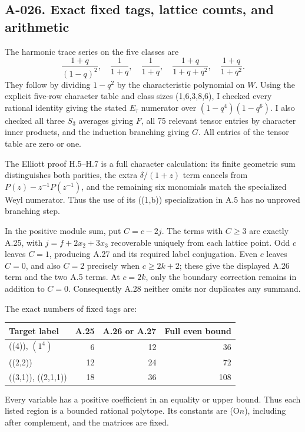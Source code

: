 \documentclass[
  10pt,
]{article}
\begin{document}
\subsection{A-026. Exact fixed tags, lattice counts, and
arithmetic}\label{a-026.-exact-fixed-tags-lattice-counts-and-arithmetic}

The harmonic trace series on the five classes are \[
\frac{1+q}{(1-q)^2},\quad\frac1{1+q},\quad\frac1{1+q},\quad
\frac{1+q}{1+q+q^2},\quad\frac{1+q}{1+q^2}.
\] They follow by dividing \(1-q^2\) by the characteristic polynomial on
\(W\). Using the explicit five-row character table and class sizes
(1,6,3,8,6), I checked every rational identity giving the stated
\(E_\tau\) numerator over \((1-q^4)(1-q^6)\). I also checked all three
\(S_3\) averages giving \(F\), all 75 relevant tensor entries by
character inner products, and the induction branching giving \(G\). All
entries of the tensor table are zero or one.

The Elliott proof H.5--H.7 is a full character calculation: its finite
geometric sum distinguishes both parities, the extra \(\delta/(1+z)\)
term cancels from \(P(z)-z^{-1}P(z^{-1})\), and the remaining six
monomials match the specialized Weyl numerator. Thus the use of its
((1,b)) specialization in A.5 has no unproved branching step.

In the positive module sum, put \(C=c-2j\). The terms with \(C\ge3\) are
exactly A.25, with \(j=f+2x_2+3x_3\) recoverable uniquely from each
lattice point. Odd \(c\) leaves \(C=1\), producing A.27 and its required
label conjugation. Even \(c\) leaves \(C=0\), and also \(C=2\) precisely
when \(c\ge2k+2\); these give the displayed A.26 term and the two A.5
terms. At \(c=2k\), only the boundary correction remains in addition to
\(C=0\). Consequently A.28 neither omits nor duplicates any summand.

The exact numbers of fixed tags are:

\begin{longtable}[]{@{}lrrr@{}}
\toprule\noalign{}
Target label & A.25 & A.26 or A.27 & Full even bound \\
\midrule\noalign{}
\endhead
\bottomrule\noalign{}
\endlastfoot
((4)), \((1^4)\) & 6 & 12 & 36 \\
((2,2)) & 12 & 24 & 72 \\
((3,1)), ((2,1,1)) & 18 & 36 & 108 \\
\end{longtable}

Every variable has a positive coefficient in an equality or upper bound.
Thus each listed region is a bounded rational polytope. Its constants
are (O\(n\)), including after complement, and the matrices are fixed.
\end{document}
